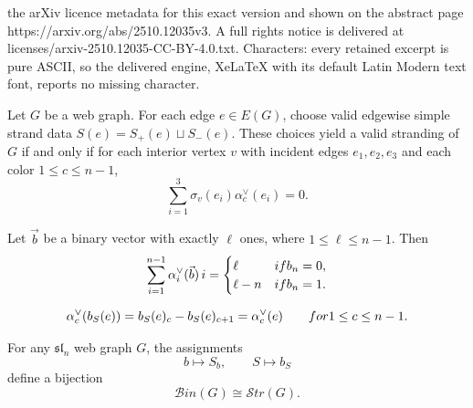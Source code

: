 \documentclass[10pt,a4paper]{amsart}
\begin{document}
the arXiv licence metadata for this exact version and shown on the abstract page https://arxiv.org/abs/2510.12035v3. A full rights notice is delivered at licenses/arxiv-2510.12035-CC-BY-4.0.txt. Characters: every retained excerpt is pure ASCII, so the delivered engine, XeLaTeX with its default Latin Modern text font, reports no missing character.
\begin{theorem}\label{thm:net zero strand contribution at each vertex}
Let $G$ be a web graph. For each edge $e\in E(G)$, choose valid edgewise simple strand data $S(e)=S_+(e)\sqcup S_-(e)$. These choices yield a valid stranding of $G$ if and only if for each interior vertex $v$ with incident edges $e_1,e_2,e_3$ and each color $1\le c\le n-1$,
$$
\sum_{i=1}^3 \sigma_v(e_i)\alpha_c^\vee(e_i)=0.
$$
\end{theorem}

\begin{lemma}\label{lem:second validity condition for strandings in terms of binary labels}
Let $\vec{b}$ be a binary vector with exactly $\ell$ ones, where $1\le \ell\le n-1$. Then
$$
\sum_{i=1}^{n-1}\alpha_i^\vee(\vec{b})\,i=
\begin{cases}
\ell & \textup{if } b_n=0,\\
\ell-n & \textup{if } b_n=1.
\end{cases}
$$
\end{lemma}

\begin{equation}\label{equation: defining b_S(e)}
\alpha_c^\vee(b_S(e))=b_S(e)_c-b_S(e)_{c+1}=\alpha_c^\vee(e)
\qquad\textup{for } 1\le c\le n-1.
\end{equation}

\begin{theorem}\label{thm: strandings are bijective with binary labelings}
For any $\mathfrak{sl}_n$ web graph $G$, the assignments
$$
b\longmapsto S_b,
\qquad
S\longmapsto b_S
$$
define a bijection
$$
\mathcal{B}in(G)\cong \mathcal{S}tr(G).
$$
\end{theorem}
\end{document}
